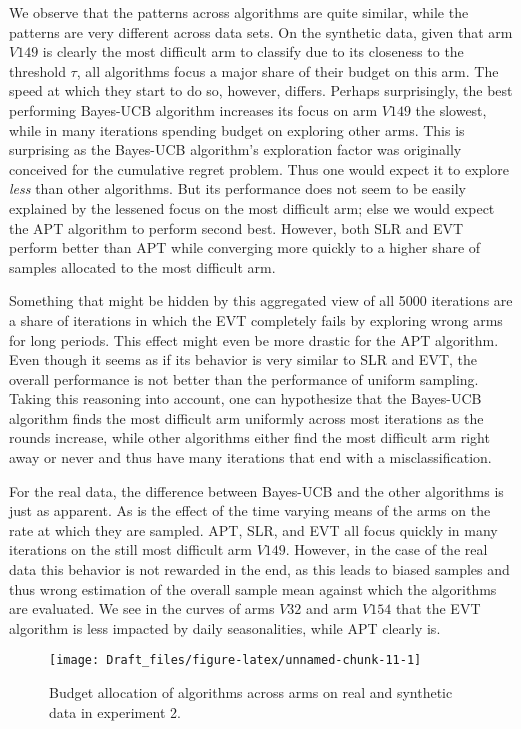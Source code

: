 \documentclass[11pt,]{article}
\begin{document}
We observe that the patterns across algorithms are quite similar, while
the patterns are very different across data sets. On the synthetic data,
given that arm \(V149\) is clearly the most difficult arm to classify
due to its closeness to the threshold \(\tau\), all algorithms focus a
major share of their budget on this arm. The speed at which they start
to do so, however, differs. Perhaps surprisingly, the best performing
Bayes-UCB algorithm increases its focus on arm \(V149\) the slowest,
while in many iterations spending budget on exploring other arms. This
is surprising as the Bayes-UCB algorithm's exploration factor was
originally conceived for the cumulative regret problem. Thus one would
expect it to explore \emph{less} than other algorithms. But its
performance does not seem to be easily explained by the lessened focus
on the most difficult arm; else we would expect the APT algorithm to
perform second best. However, both SLR and EVT perform better than APT
while converging more quickly to a higher share of samples allocated to
the most difficult arm.

Something that might be hidden by this aggregated view of all 5000
iterations are a share of iterations in which the EVT completely fails
by exploring wrong arms for long periods. This effect might even be more
drastic for the APT algorithm. Even though it seems as if its behavior
is very similar to SLR and EVT, the overall performance is not better
than the performance of uniform sampling. Taking this reasoning into
account, one can hypothesize that the Bayes-UCB algorithm finds the most
difficult arm uniformly across most iterations as the rounds increase,
while other algorithms either find the most difficult arm right away or
never and thus have many iterations that end with a misclassification.

For the real data, the difference between Bayes-UCB and the other
algorithms is just as apparent. As is the effect of the time varying
means of the arms on the rate at which they are sampled. APT, SLR, and
EVT all focus quickly in many iterations on the still most difficult arm
\(V149\). However, in the case of the real data this behavior is not
rewarded in the end, as this leads to biased samples and thus wrong
estimation of the overall sample mean against which the algorithms are
evaluated. We see in the curves of arms \(V32\) and arm \(V154\) that
the EVT algorithm is less impacted by daily seasonalities, while APT
clearly is.

\begin{figure}

{\centering \texttt{[image: Draft\_files/figure-latex/unnamed-chunk-11-1]} 

}

\caption{Budget allocation of algorithms across arms on real and synthetic data in experiment 2.}\label{fig:unnamed-chunk-11}
\end{figure}
\end{document}

